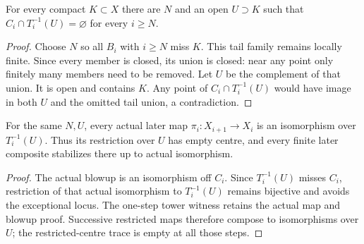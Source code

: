\begin{theorem}
\label{hir:growing-canonical-sequence-open-tail}
\leanok
For every compact $K\subset X$ there are $N$ and an open $U\supset K$
such that $C_i\cap T_i^{-1}(U)=\varnothing$ for every $i\ge N$.
\end{theorem}
\begin{proof}
Choose $N$ so all $B_i$ with $i\ge N$ miss $K$. This tail family remains
locally finite. Since every member is closed, its union is closed: near any
point only finitely many members need to be removed. Let $U$ be the complement
of that union. It is open and contains $K$. Any point of $C_i\cap T_i^{-1}(U)$
would have image in both $U$ and the omitted tail union, a contradiction.
\end{proof}

\begin{theorem}
\label{hir:growing-canonical-sequence-isomorphism-tail}
\leanok
For the same $N,U$, every actual later map $\pi_i:X_{i+1}\to X_i$ is an
isomorphism over $T_i^{-1}(U)$. Thus its restriction over $U$ has empty
centre, and every finite later composite stabilizes there up to actual
isomorphism.
\end{theorem}
\begin{proof}
The actual blowup is an isomorphism off $C_i$. Since $T_i^{-1}(U)$ misses
$C_i$, restriction of that actual isomorphism to $T_i^{-1}(U)$ remains
bijective and avoids the exceptional locus. The one-step tower witness
retains the actual map and blowup proof. Successive restricted maps therefore
compose to isomorphisms over $U$; the restricted-centre trace is empty at
all those steps.
\end{proof}


